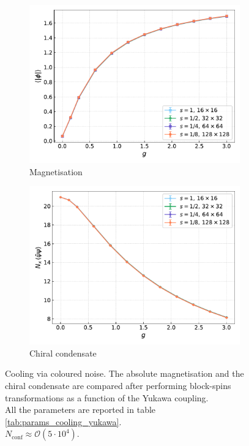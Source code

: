 \begin{figure}[hbp]
    \centering
    \begin{subfigure}[b]{0.47\textwidth}
        \includegraphics[width=\textwidth]{figures/cooling/yukawa_scan/magnetisation.pdf}
        \caption{Magnetisation}
    \end{subfigure}
    \hfill
    \begin{subfigure}[b]{0.47\textwidth}
        \includegraphics[width=\textwidth]{figures/cooling/yukawa_scan/condensate.pdf}
        \caption{Chiral condensate}
    \end{subfigure}
    \caption[Cooling stochastic quantisation: fields as a function of the Yukawa coupling.]{Cooling via coloured noise. The absolute magnetisation and the chiral condensate are compared after performing block-spins transformations as a function of the Yukawa coupling. \\ All the parameters are reported in table \ref{tab:params_cooling_yukawa}. \\$N_\text{conf} \approx \mathcal{O}(5 \cdot 10^4)$. }
    \label{fig:cooling_M_psibarpsi}
\end{figure}
